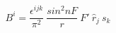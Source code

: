 \begin{equation}
B^i=\frac{\epsilon^{ijk}}{\pi^2}~\frac{sin^2nF}{r}~F'~{\hat{r}}_j~s_k
\end{equation}

